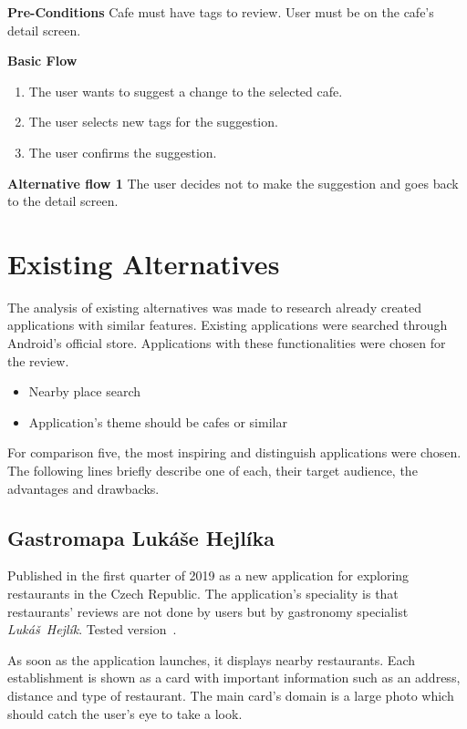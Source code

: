 \textbf{Pre-Conditions} Cafe must have tags to review.  User must be on the cafe's detail screen.

\newpara
\textbf{Basic Flow}

\begin{enumerate}
    \item The user wants to suggest a change to the selected cafe.
    \item The user selects new tags for the suggestion. 
    \item The user confirms the suggestion.
\end{enumerate}

\textbf{Alternative flow 1} The user decides not to make the suggestion and goes back to the detail screen.



\section{Existing Alternatives}
The analysis of existing alternatives was made to research already created applications with similar features. Existing applications were searched through Android's official store. Applications with these functionalities were chosen for the review.

\begin{itemize}
    \item Nearby place search
    \item Application's theme should be cafes or similar
\end{itemize}

For comparison five, the most inspiring and distinguish applications were chosen. The following lines briefly describe one of each, their target audience, the advantages and drawbacks. 

\subsection{Gastromapa Lukáše Hejlíka}
Published in the first quarter of 2019 as a new application for exploring restaurants in the Czech Republic.  The application's speciality is that restaurants' reviews are not done by users but by gastronomy specialist \textit{Lukáš~Hejlík}. Tested version~\cite{app-hejlik}.

As soon as the application launches, it displays nearby restaurants. Each establishment is shown as a card with important information such as an address, distance and type of restaurant. The main card's domain is a large photo which should catch the user's eye to take a look. 

